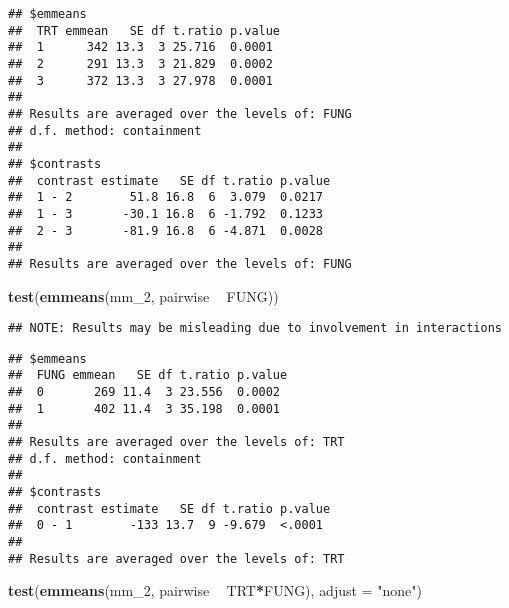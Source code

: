 \documentclass[]{book}
\newenvironment{Shaded}{\begin{snugshade}}{\end{snugshade}}
\newcommand{\DataTypeTok}[1]{\textcolor[rgb]{0.13,0.29,0.53}{#1}}
\newcommand{\DecValTok}[1]{\textcolor[rgb]{0.00,0.00,0.81}{#1}}
\newcommand{\KeywordTok}[1]{\textcolor[rgb]{0.13,0.29,0.53}{\textbf{#1}}}
\newcommand{\NormalTok}[1]{#1}
\newcommand{\OperatorTok}[1]{\textcolor[rgb]{0.81,0.36,0.00}{\textbf{#1}}}
\newcommand{\StringTok}[1]{\textcolor[rgb]{0.31,0.60,0.02}{#1}}
\begin{document}
\begin{verbatim}
## $emmeans
##  TRT emmean   SE df t.ratio p.value
##  1      342 13.3  3 25.716  0.0001 
##  2      291 13.3  3 21.829  0.0002 
##  3      372 13.3  3 27.978  0.0001 
## 
## Results are averaged over the levels of: FUNG 
## d.f. method: containment 
## 
## $contrasts
##  contrast estimate   SE df t.ratio p.value
##  1 - 2        51.8 16.8  6  3.079  0.0217 
##  1 - 3       -30.1 16.8  6 -1.792  0.1233 
##  2 - 3       -81.9 16.8  6 -4.871  0.0028 
## 
## Results are averaged over the levels of: FUNG
\end{verbatim}

\begin{Shaded}
\begin{Highlighting}[]
\KeywordTok{test}\NormalTok{(}\KeywordTok{emmeans}\NormalTok{(mm_}\DecValTok{2}\NormalTok{, pairwise }\OperatorTok{~}\StringTok{ }\NormalTok{FUNG))}
\end{Highlighting}
\end{Shaded}

\begin{verbatim}
## NOTE: Results may be misleading due to involvement in interactions
\end{verbatim}

\begin{verbatim}
## $emmeans
##  FUNG emmean   SE df t.ratio p.value
##  0       269 11.4  3 23.556  0.0002 
##  1       402 11.4  3 35.198  0.0001 
## 
## Results are averaged over the levels of: TRT 
## d.f. method: containment 
## 
## $contrasts
##  contrast estimate   SE df t.ratio p.value
##  0 - 1        -133 13.7  9 -9.679  <.0001 
## 
## Results are averaged over the levels of: TRT
\end{verbatim}

\begin{Shaded}
\begin{Highlighting}[]
\KeywordTok{test}\NormalTok{(}\KeywordTok{emmeans}\NormalTok{(mm_}\DecValTok{2}\NormalTok{, pairwise }\OperatorTok{~}\StringTok{ }\NormalTok{TRT}\OperatorTok{*}\NormalTok{FUNG), }\DataTypeTok{adjust =} \StringTok{"none"}\NormalTok{)}
\end{Highlighting}
\end{Shaded}
\end{document}
